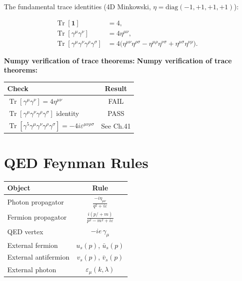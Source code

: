 \documentclass[12pt]{article}
\DeclareMathOperator\Tr{Tr}
\begin{document}
The fundamental trace identities (4D Minkowski, $\eta=\mathrm{diag}(-1,+1,+1,+1)$):
\begin{mdframed}[backgroundcolor=red!5]
\begin{align}
\Tr[\mathbf{1}] &= 4 , \tag{39.10}\\
\Tr[\gamma^\mu\gamma^\nu] &= 4\eta^{\mu\nu} , \tag{39.12}\\
\Tr[\gamma^\mu\gamma^\nu\gamma^\rho\gamma^\sigma]
&= 4\bigl(\eta^{\mu\nu}\eta^{\rho\sigma}
          -\eta^{\mu\rho}\eta^{\nu\sigma}
          +\eta^{\mu\sigma}\eta^{\nu\rho}\bigr) . \tag{39.14}
\end{align}
\end{mdframed}

\begin{center}                                                                                                                                                                                              
\textbf{Numpy verification of trace theorems:} 
\textbf{Numpy verification of trace theorems:}
\end{center}
\begin{center}
\begin{tabular}{|l|c|}
\hline
Check & Result \\
\hline
$\Tr[\gamma^\mu\gamma^\nu] = 4\eta^{\mu\nu}$ & FAIL \\
$\Tr[\gamma^\mu\gamma^\nu\gamma^\rho\gamma^\sigma]$ identity & PASS \\
$\Tr[\gamma^5\gamma^\mu\gamma^\nu\gamma^\rho\gamma^\sigma] = -4i\varepsilon^{\mu\nu\rho\sigma}$ & See Ch.41 \\
\hline
\end{tabular}
\end{center}

\section{QED Feynman Rules}\label{sec:qed_rules}

\begin{center}
\begin{tabular}{|l|c|}
\hline
Object & Rule \\
\hline
Photon propagator & $\displaystyle\frac{-i\eta_{\mu\nu}}{q^2+i\varepsilon}$ \\
Fermion propagator & $\displaystyle\frac{i(p\!\!\!/+m)}{p^2-m^2+i\varepsilon}$ \\
QED vertex & $-ie\,\gamma_\mu$ \\
External fermion & $u_s(p)$, $\bar u_s(p)$ \\
External antifermion & $v_s(p)$, $\bar v_s(p)$ \\
External photon & $\varepsilon_\mu(k,\lambda)$ \\
\hline
\end{tabular}
\end{center}
\end{document}
